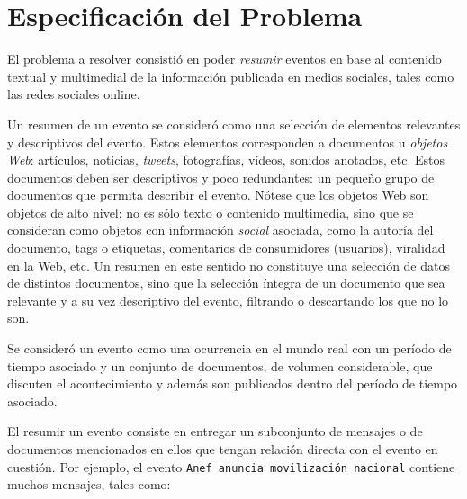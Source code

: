 
\chapter{Especificación del Problema}
\label{sec-3}

\label{cap:problema}

  El problema a resolver consistió en poder \emph{resumir} eventos en base
  al contenido textual y multimedial de la información publicada en
  medios sociales, tales como las redes sociales online. 

  Un resumen de un evento se consideró como una selección de elementos relevantes 
  y descriptivos del evento. Estos elementos corresponden a documentos u 
  \emph{objetos Web}: artículos, noticias, \emph{tweets}, fotografías, 
  vídeos, sonidos anotados, etc. Estos documentos deben ser descriptivos y poco redundantes:
  un pequeño grupo de documentos que permita describir el evento. Nótese que los
  objetos Web son objetos de alto nivel: no es sólo texto o contenido multimedia, sino
  que se consideran como objetos con información \emph{social} asociada, como la autoría
  del documento, tags o etiquetas, comentarios de consumidores (usuarios), viralidad en
  la Web, etc. Un resumen en este sentido no constituye una selección de datos de distintos documentos,
  sino que la selección íntegra de un documento que sea relevante y a su vez descriptivo del evento, filtrando
  o descartando los que no lo son.

  Se consideró un evento como una ocurrencia en el mundo real
  con un período de tiempo asociado y un conjunto de documentos, de
  volumen considerable, que discuten el acontecimiento y además son publicados
  dentro del período de tiempo asociado.

  El resumir un evento consiste en entregar un subconjunto de
  mensajes o de documentos mencionados en ellos que tengan
  relación directa con el evento en cuestión. Por ejemplo, el evento
  \texttt{Anef anuncia movilización nacional} contiene muchos mensajes, tales
  como:

